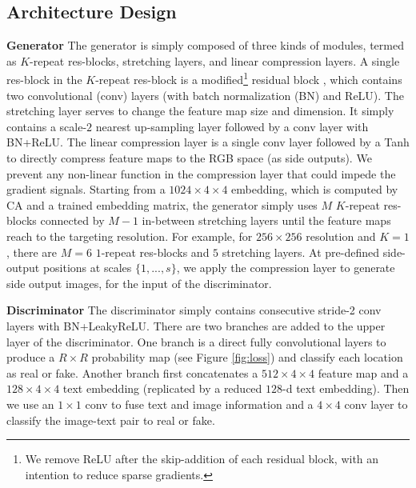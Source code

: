 \documentclass[10pt,twocolumn,letterpaper]{article}
\begin{document}
\subsection{Architecture Design}

\textbf{Generator} The generator is simply composed of three kinds of modules, termed as $K$-repeat res-blocks, stretching layers, and linear compression layers.
A single res-block in the $K$-repeat res-block is a modified\footnote{We remove ReLU after the skip-addition of each residual block, with an intention to reduce sparse gradients.} residual block \cite{he2016identity}, which contains two convolutional (conv) layers (with batch normalization (BN) \cite{ioffe2015batch} and ReLU). The stretching layer serves to change the feature map size and dimension. It simply contains a scale-$2$ nearest up-sampling layer followed by a conv layer with BN+ReLU. The linear compression layer is a single conv layer followed by a Tanh to directly compress feature maps to the RGB space (as side outputs). We prevent any non-linear function in the compression layer that could impede the gradient signals. 
Starting from a $1024{\times}4{\times}4$ embedding, which is computed by CA and a trained embedding matrix, the generator simply uses $M$ $K$-repeat res-blocks connected by $M{-}1$ in-between stretching layers until the feature maps reach to the targeting resolution. 
For example, for $256{\times}256$ resolution and $K{=}1$, there are $M{=}6$ $1$-repeat res-blocks and $5$ stretching layers. 
At pre-defined side-output positions at scales $\{1,...,s\}$, we apply the compression layer to generate side output images, for the input of the discriminator. 

\textbf{Discriminator} The discriminator simply contains consecutive stride-2 conv layers with BN+LeakyReLU. There are two branches are added to the upper layer of the discriminator. One branch is a direct fully convolutional layers to produce a $R{\times}R$ probability map (see Figure \ref{fig:loss}) and classify each location as real or fake. 
Another branch first concatenates a $512{\times}4{\times}4$ feature map and a $128{\times}4{\times}4$ text embedding (replicated by a reduced $128$-d text embedding). Then we use an $1{\times}1$ conv to fuse text and image information and a $4{\times}4$ conv layer to classify the image-text pair to real or fake.
\end{document}
